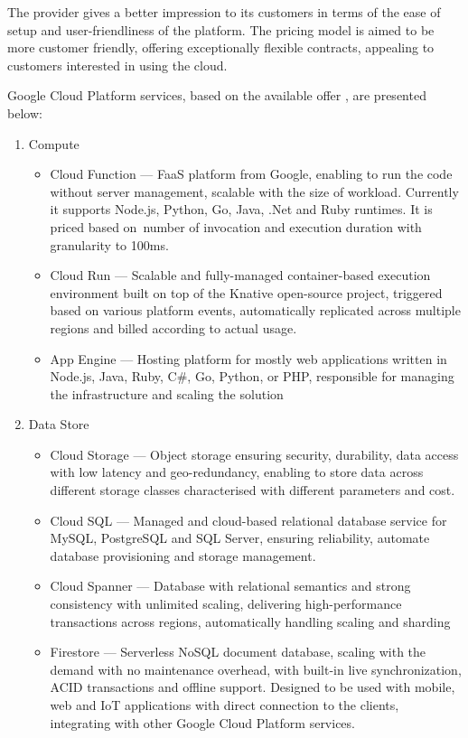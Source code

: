 The provider gives a better impression to its customers in terms of the ease of setup and user-friendliness of the platform. The pricing model is aimed to be more customer friendly, offering exceptionally flexible contracts, appealing to customers interested in using the cloud.

Google Cloud Platform services, based on the available offer \cite{GCPServerlessOffering}, are presented below:

\begin{enumerate}
   \item Compute
   \begin{itemize}
       \item Cloud Function --- FaaS platform from Google, enabling to run the code without server management, scalable with the size of workload. Currently it supports Node.js, Python, Go, Java, .Net and Ruby runtimes. It is priced based on~number of invocation and execution duration with granularity to 100ms.
       \item Cloud Run --- Scalable and fully-managed container-based execution environment built on top of the Knative open-source project, triggered based on various platform events, automatically replicated across multiple regions and billed according to actual usage.
       \item App Engine --- Hosting platform for mostly web applications written in Node.js, Java, Ruby, C\#, Go, Python, or PHP, responsible for managing the infrastructure and scaling the solution
   \end{itemize}
   \item Data Store
   \begin{itemize}
       \item Cloud Storage --- Object storage ensuring security, durability, data access with low latency and geo-redundancy, enabling to store data across different storage classes characterised with different parameters and cost.
       \item Cloud SQL --- Managed and cloud-based relational database service for MySQL, PostgreSQL and SQL Server, ensuring reliability, automate database provisioning and storage management.
       \item Cloud Spanner --- Database with relational semantics and strong consistency with unlimited scaling, delivering high-performance transactions across regions, automatically handling scaling and sharding
       \item Firestore --- Serverless NoSQL document database, scaling with the demand with no maintenance overhead, with built-in live synchronization, ACID transactions and offline support. Designed to be used with mobile, web and IoT applications with direct connection to the clients, integrating with other Google Cloud Platform services.

\end{itemize}
\end{enumerate}
